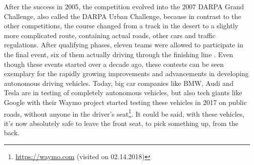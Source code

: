After the success in 2005, the competition evolved into the 2007 DARPA Grand Challenge, also called the DARPA Urban Challenge, because in contrast to the other competitions, the course changed from a track in the desert to a slightly more complicated route, containing actual roads, other cars and traffic regulations. After qualifying phases, eleven teams were allowed to participate in the final event, six of them actually driving through the finishing line \cite{darpa2007}.\newline
Even though these events started over a decade ago, 
these contests can be seen exemplary for the rapidly growing improvements and advancements in developing autonomous driving vehicles. Today, big car companies like BMW, Audi and Tesla are in testing of completely autonomous vehicles, but also tech giants like Google with their Waymo project  started testing these vehicles in 2017 on public roads, without anyone in the driver's seat\footnote{\url{https://waymo.com} (visited on 02.14.2018)}. It could be said, with these vehicles, it's now absolutely safe to leave the front seat, to pick something up, from the back. 
